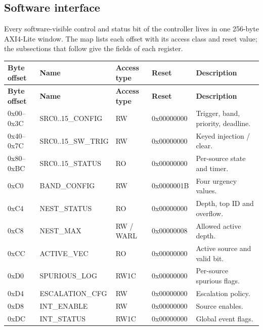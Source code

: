 \documentclass[11pt]{article}
\begin{document}
\subsection{Software interface}
\noindent Every software-visible control and status bit of the controller lives in one 256-byte AXI4-Lite window. The map lists each offset with its access class and reset value; the subsections that follow give the fields of each register.\par\medskip
{\small
\begin{longtable}{@{}L{0.1700\dimexpr\linewidth-48pt\relax}L{0.2400\dimexpr\linewidth-48pt\relax}L{0.1300\dimexpr\linewidth-48pt\relax}L{0.1700\dimexpr\linewidth-48pt\relax}L{0.2900\dimexpr\linewidth-48pt\relax}@{}}
\toprule
\textbf{Byte offset} & \textbf{Name} & \textbf{Access type} & \textbf{Reset} & \textbf{Description} \\ \midrule
\endfirsthead
\toprule
\textbf{Byte offset} & \textbf{Name} & \textbf{Access type} & \textbf{Reset} & \textbf{Description} \\ \midrule
\endhead
0x00–0x3C & SRC0..15\_CONFIG & RW & 0x00000000 & Trigger, band, priority, deadline. \\ \addlinespace[3pt]
0x40–0x7C & SRC0..15\_SW\_TRIG & RW & 0x00000000 & Keyed injection / clear. \\ \addlinespace[3pt]
0x80–0xBC & SRC0..15\_STATUS & RO & 0x00000000 & Per-source state and timer. \\ \addlinespace[3pt]
0xC0 & BAND\_CONFIG & RW & 0x0000001B & Four urgency values. \\ \addlinespace[3pt]
0xC4 & NEST\_STATUS & RO & 0x00000000 & Depth, top ID and overflow. \\ \addlinespace[3pt]
0xC8 & NEST\_MAX & RW / WARL & 0x00000008 & Allowed active depth. \\ \addlinespace[3pt]
0xCC & ACTIVE\_VEC & RO & 0x00000000 & Active source and valid bit. \\ \addlinespace[3pt]
0xD0 & SPURIOUS\_LOG & RW1C & 0x00000000 & Per-source spurious flags. \\ \addlinespace[3pt]
0xD4 & ESCALATION\_CFG & RW & 0x00000000 & Escalation policy. \\ \addlinespace[3pt]
0xD8 & INT\_ENABLE & RW & 0x00000000 & Source enables. \\ \addlinespace[3pt]
0xDC & INT\_STATUS & RW1C & 0x00000000 & Global event flags. \\*
\bottomrule\end{longtable}}
\end{document}

